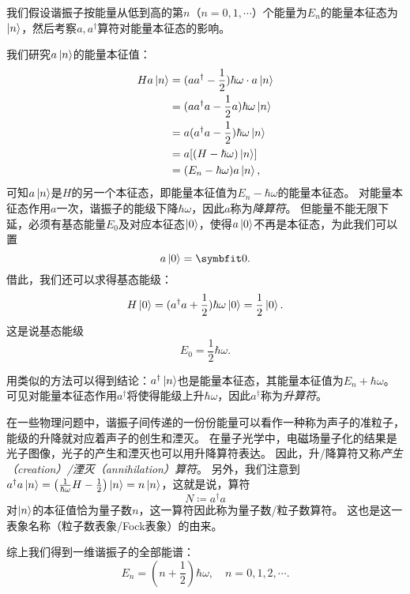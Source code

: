 我们假设谐振子按能量从低到高的第$n$（$n=0,1,\cdots$）个能量为$E_n$的能量本征态为$\ket{n}$，然后考察$a,a^\dag$算符对能量本征态的影响。

我们研究$a\ket{n}$的能量本征值：
\begin{equation}
\begin{aligned}
    H a \ket{n}
    &= (a a^\dagger - \frac12)\hbar\omega \cdot a \ket{n} \\
    &= (a a^\dagger a - \frac12 a)\hbar\omega \ket{n} \\
    &= a (a^\dagger a - \frac12)\hbar\omega \ket{n} \\
    &= a [(H-\hbar\omega) \ket{n}] \\
    &= (E_n-\hbar\omega) a \ket{n},
\end{aligned}
\end{equation}
可知$a\ket{n}$是$H$的另一个本征态，即能量本征值为$E_n-\hbar\omega$的能量本征态。
对能量本征态作用$a$一次，谐振子的能级下降$\hbar\omega$，因此$a$称为\emph{降算符}。
但能量不能无限下延，必须有基态能量$E_0$及对应本征态$\ket{0}$，使得$a\ket{0}$不再是本征态，为此我们可以置
\begin{equation}
    a \ket{0} = \bm{0}.
\end{equation}
借此，我们还可以求得基态能级：
\begin{equation}
    H\ket{0}
    = (a^\dagger a+\frac12)\hbar\omega \ket{0}
    = \frac12 \ket{0}.
\end{equation}
这是说基态能级
\begin{equation}
    E_0 = \frac12 \hbar\omega.
\end{equation}

用类似的方法可以得到结论：$a^\dagger\ket{n}$也是能量本征态，其能量本征值为$E_n+\hbar\omega$。
可见对能量本征态作用$a^\dag$将使得能级上升$\hbar\omega$，因此$a^\dag$称为\emph{升算符}。

在一些物理问题中，谐振子间传递的一份份能量可以看作一种称为声子的准粒子，能级的升降就对应着声子的创生和湮灭。
在量子光学中，电磁场量子化的结果是光子图像，光子的产生和湮灭也可以用升降算符表达。
因此，升/降算符又称\emph{产生（creation）/湮灭（annihilation）算符}。
另外，我们注意到$a^\dagger a\ket{n}=\left(\frac{1}{\hbar\omega}H-\frac12\right)\ket{n}=n\ket{n}$，这就是说，算符
\begin{equation}
    N \coloneq a^\dag a
\end{equation}
对$\ket{n}$的本征值恰为量子数$n$，这一算符因此称为量子数/粒子数算符。
这也是这一表象名称（粒子数表象/Fock表象）的由来。

综上我们得到一维谐振子的全部能谱：
\begin{equation}
    E_n = \left(n+\frac12\right) \hbar\omega ,\quad n=0,1,2,\cdots.
\end{equation}

